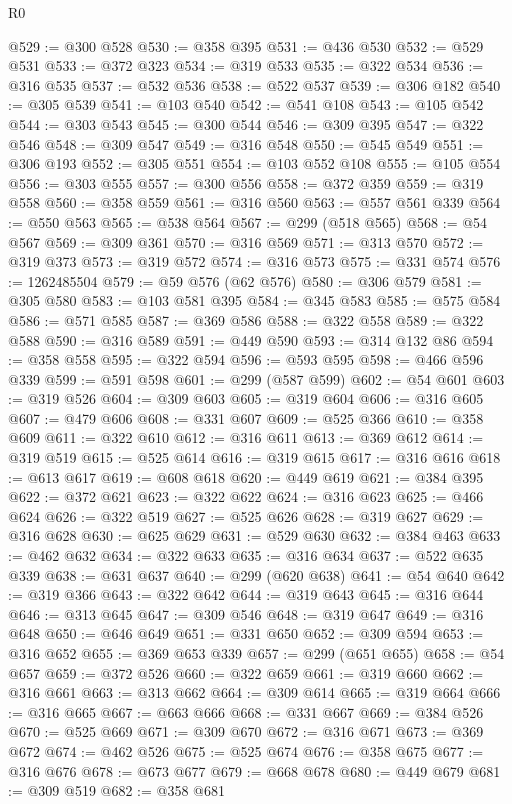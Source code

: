 \begin{lexlean}{R0}
\begin{coremodule}
@529 := @300 @528
@530 := @358 @395
@531 := @436 @530
@532 := @529 @531
@533 := @372 @323
@534 := @319 @533
@535 := @322 @534
@536 := @316 @535
@537 := @532 @536
@538 := @522 @537
@539 := @306 @182
@540 := @305 @539
@541 := @103 @540
@542 := @541 @108
@543 := @105 @542
@544 := @303 @543
@545 := @300 @544
@546 := @309 @395
@547 := @322 @546
@548 := @309 @547
@549 := @316 @548
@550 := @545 @549
@551 := @306 @193
@552 := @305 @551
@554 := @103 @552 @108
@555 := @105 @554
@556 := @303 @555
@557 := @300 @556
@558 := @372 @359
@559 := @319 @558
@560 := @358 @559
@561 := @316 @560
@563 := @557 @561 @339
@564 := @550 @563
@565 := @538 @564
@567 := @299 (@518 @565)
@568 := @54 @567
@569 := @309 @361
@570 := @316 @569
@571 := @313 @570
@572 := @319 @373
@573 := @319 @572
@574 := @316 @573
@575 := @331 @574
@576 := 1262485504
@579 := @59 @576 (@62 @576)
@580 := @306 @579
@581 := @305 @580
@583 := @103 @581 @395
@584 := @345 @583
@585 := @575 @584
@586 := @571 @585
@587 := @369 @586
@588 := @322 @558
@589 := @322 @588
@590 := @316 @589
@591 := @449 @590
@593 := @314 @132 @86
@594 := @358 @558
@595 := @322 @594
@596 := @593 @595
@598 := @466 @596 @339
@599 := @591 @598
@601 := @299 (@587 @599)
@602 := @54 @601
@603 := @319 @526
@604 := @309 @603
@605 := @319 @604
@606 := @316 @605
@607 := @479 @606
@608 := @331 @607
@609 := @525 @366
@610 := @358 @609
@611 := @322 @610
@612 := @316 @611
@613 := @369 @612
@614 := @319 @519
@615 := @525 @614
@616 := @319 @615
@617 := @316 @616
@618 := @613 @617
@619 := @608 @618
@620 := @449 @619
@621 := @384 @395
@622 := @372 @621
@623 := @322 @622
@624 := @316 @623
@625 := @466 @624
@626 := @322 @519
@627 := @525 @626
@628 := @319 @627
@629 := @316 @628
@630 := @625 @629
@631 := @529 @630
@632 := @384 @463
@633 := @462 @632
@634 := @322 @633
@635 := @316 @634
@637 := @522 @635 @339
@638 := @631 @637
@640 := @299 (@620 @638)
@641 := @54 @640
@642 := @319 @366
@643 := @322 @642
@644 := @319 @643
@645 := @316 @644
@646 := @313 @645
@647 := @309 @546
@648 := @319 @647
@649 := @316 @648
@650 := @646 @649
@651 := @331 @650
@652 := @309 @594
@653 := @316 @652
@655 := @369 @653 @339
@657 := @299 (@651 @655)
@658 := @54 @657
@659 := @372 @526
@660 := @322 @659
@661 := @319 @660
@662 := @316 @661
@663 := @313 @662
@664 := @309 @614
@665 := @319 @664
@666 := @316 @665
@667 := @663 @666
@668 := @331 @667
@669 := @384 @526
@670 := @525 @669
@671 := @309 @670
@672 := @316 @671
@673 := @369 @672
@674 := @462 @526
@675 := @525 @674
@676 := @358 @675
@677 := @316 @676
@678 := @673 @677
@679 := @668 @678
@680 := @449 @679
@681 := @309 @519
@682 := @358 @681

\end{coremodule}
\end{lexlean}
